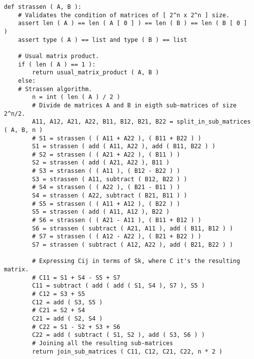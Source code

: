 \begin{lstlisting}
def strassen ( A, B ):
    # Validates the condition of matrices of [ 2^n x 2^n ] size.
    assert len ( A ) == len ( A [ 0 ] ) == len ( B ) == len ( B [ 0 ] )
    assert type ( A ) == list and type ( B ) == list

    # Usual matrix product.
    if ( len ( A ) == 1 ):
        return usual_matrix_product ( A, B )
    else:
    # Strassen algorithm.
        n = int ( len ( A ) / 2 )
        # Divide de matrices A and B in eigth sub-matrices of size 2^n/2.
        A11, A12, A21, A22, B11, B12, B21, B22 = split_in_sub_matrices ( A, B, n )
        # S1 = strassen ( ( A11 + A22 ), ( B11 + B22 ) )
        S1 = strassen ( add ( A11, A22 ), add ( B11, B22 ) )
        # S2 = strassen ( ( A21 + A22 ), ( B11 ) )
        S2 = strassen ( add ( A21, A22 ), B11 )
        # S3 = strassen ( ( A11 ), ( B12 - B22 ) )
        S3 = strassen ( A11, subtract ( B12, B22 ) )
        # S4 = strassen ( ( A22 ), ( B21 - B11 ) )
        S4 = strassen ( A22, subtract ( B21, B11 ) )
        # S5 = strassen ( ( A11 + A12 ), ( B22 ) )
        S5 = strassen ( add ( A11, A12 ), B22 )
        # S6 = strassen ( ( A21 - A11 ), ( B11 + B12 ) )
        S6 = strassen ( subtract ( A21, A11 ), add ( B11, B12 ) )
        # S7 = strassen ( ( A12 - A22 ), ( B21 + B22 ) )
        S7 = strassen ( subtract ( A12, A22 ), add ( B21, B22 ) )

        # Expressing Cij in terms of Sk, where C it's the resulting matrix.
        # C11 = S1 + S4 - S5 + S7
        C11 = subtract ( add ( add ( S1, S4 ), S7 ), S5 )
        # C12 = S3 + S5
        C12 = add ( S3, S5 )
        # C21 = S2 + S4
        C21 = add ( S2, S4 )
        # C22 = S1 - S2 + S3 + S6
        C22 = add ( subtract ( S1, S2 ), add ( S3, S6 ) )
        # Joining all the resulting sub-matrices
        return join_sub_matrices ( C11, C12, C21, C22, n * 2 )
\end{lstlisting} \hfill

\pagebreak